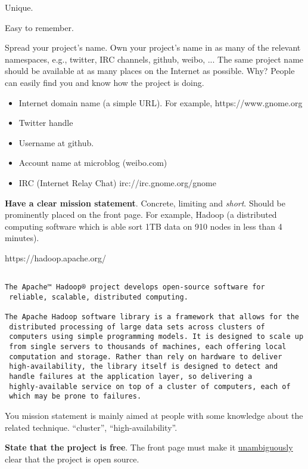 \documentclass[landscape,30pt]{foils}
\begin{document}
Unique.

Easy to remember.


Spread your project's name.  Own your project's name in as many of the relevant namespaces, e.g., twitter, IRC channels, github, weibo, ...  The same project name should be available at as many places on the Internet as possible.  Why?  People can easily find you and know how the project is doing.

\begin{itemize}
\item Internet domain name (a simple URL). For example,  https://www.gnome.org
\item Twitter handle
\item Username at github.
\item Account name at microblog (weibo.com)
\item IRC (Internet Relay Chat)  irc://irc.gnome.org/gnome
\end{itemize}


{\bf Have a clear mission statement}.  Concrete, limiting and {\em short}.   Should be prominently placed on the front page.   For example, Hadoop (a distributed computing software which is able sort 1TB data on 910 nodes in less than 4 minutes).

https://hadoop.apache.org/


\newpage
{\scriptsize
\begin{verbatim}

The Apache™ Hadoop® project develops open-source software for
 reliable, scalable, distributed computing.

The Apache Hadoop software library is a framework that allows for the
 distributed processing of large data sets across clusters of
 computers using simple programming models. It is designed to scale up
 from single servers to thousands of machines, each offering local
 computation and storage. Rather than rely on hardware to deliver
 high-availability, the library itself is designed to detect and
 handle failures at the application layer, so delivering a
 highly-available service on top of a cluster of computers, each of
 which may be prone to failures.

\end{verbatim}
}

You mission statement is mainly aimed at people with some knowledge
about the related technique.  ``cluster'', ``high-availability''.

{\bf State that the project is free}.  The front page must make it
\underline{unambiguously} clear that the project is open source.
\end{document}
